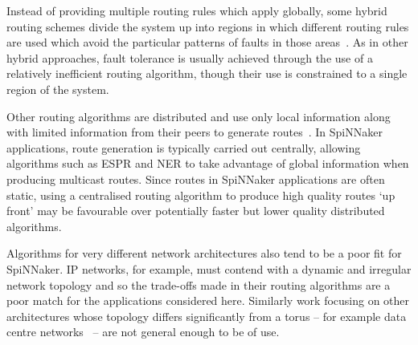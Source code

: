 			Instead of providing multiple routing rules which apply globally, some
			hybrid routing schemes divide the system up into regions in which
			different routing rules are used which avoid the particular patterns of
			faults in those areas~\cite{mejia06,boppana95}. As in other hybrid
			approaches, fault tolerance is usually achieved through the use of a
			relatively inefficient routing algorithm, though their use is constrained
			to a single region of the system.
			
			Other routing algorithms are distributed and use only local information
			along with limited information from their peers to generate
			routes~\cite{fick09b}. In SpiNNaker applications, route generation is
			typically carried out centrally, allowing algorithms such as ESPR and NER
			to take advantage of global information when producing multicast routes.
			Since routes in SpiNNaker applications are often static, using a
			centralised routing algorithm to produce high quality routes `up front'
			may be favourable over potentially faster but lower quality distributed
			algorithms.
			
			Algorithms for very different network architectures also tend to be a
			poor fit for SpiNNaker. IP networks, for example, must contend with a
			dynamic and irregular network topology and so the trade-offs made in
			their routing algorithms are a poor match for the applications considered
			here.  Similarly work focusing on other architectures whose topology
			differs significantly from a torus -- for example data centre
			networks~\cite{guo08,liao12} -- are not general enough to be of use.
			
	
